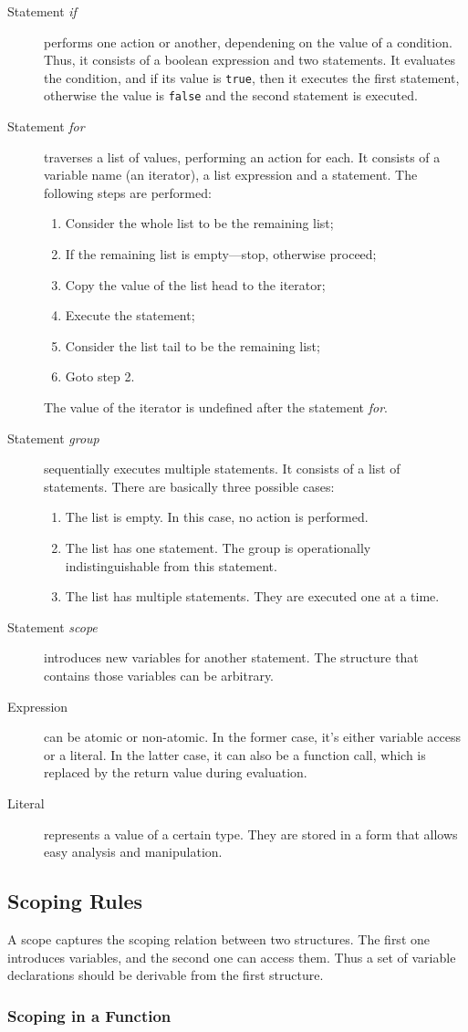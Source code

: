 \documentclass [a4paper] {article}
\begin{document}
\begin {description}
\item [Statement \emph{if}] performs one action or another, dependening on the
value of a condition. Thus, it consists of a boolean expression and two
statements. It evaluates the condition, and if its value is \texttt{true}, then
it executes the first statement, otherwise the value is \texttt{false} and the
second statement is executed.

\item [Statement \emph{for}] traverses a list of values, performing an action
for each. It consists of a variable name (an iterator), a list expression and a
statement. The following steps are performed:
\begin {enumerate}
\item Consider the whole list to be the remaining list;
\item If the remaining list is empty---stop, otherwise proceed;
\item Copy the value of the list head to the iterator;
\item Execute the statement;
\item Consider the list tail to be the remaining list;
\item Goto step 2.
\end {enumerate}
The value of the iterator is undefined after the statement \emph{for}.

\item [Statement \emph{group}] sequentially executes multiple statements. It
consists of a list of statements. There are basically three possible cases:
\begin {enumerate}
\item The list is empty. In this case, no action is performed.
\item The list has one statement. The group is operationally indistinguishable
from this statement.
\item The list has multiple statements. They are executed one at a time.
\end {enumerate}

\item [Statement \emph{scope}] introduces new variables for another statement.
The structure that contains those variables can be arbitrary.

\item [Expression] can be atomic or non-atomic. In the former case, it's either
variable access or a literal. In the latter case, it can also be a function
call, which is replaced by the return value during evaluation.

\item [Literal] represents a value of a certain type. They are stored in a form
that allows easy analysis and manipulation.

\end {description}

\subsection { Scoping Rules }

A scope captures the scoping relation between two structures. The first one
introduces variables, and the second one can access them. Thus a set of variable
declarations should be derivable from the first structure.

\subsubsection { Scoping in a Function }
\end{document}
